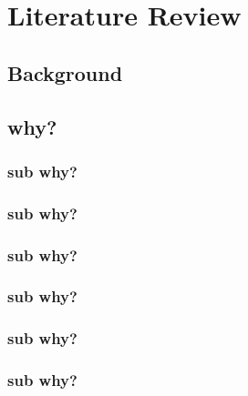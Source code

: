 \chapter{Literature Review}
\label{ch:literature-review}

\lipsum[11-12]


\section{Background}
\label{sec:background}

\lipsum[13]

\section{why?}
\label{sec:why}

\lipsum[13]
\subsection{sub why?}
\label{sec:sub-why}

\lipsum[13]

\subsection{sub why?}
\label{sec:sub-why28}

\lipsum[13]
\subsection{sub why?}
\label{sec:sub-why27}

\lipsum[13]

\subsection{sub why?}
\label{sec:sub-why26}

\lipsum[13]

\subsection{sub why?}
\label{sec:sub-why25}

\lipsum[13]

\subsection{sub why?}
\label{sec:sub-why24}

\lipsum[13]

